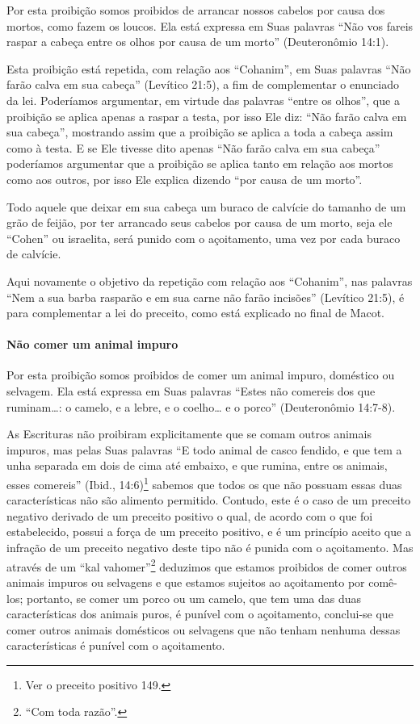 Por esta proibição somos proibidos de arrancar nossos cabelos por causa
dos mortos, como fazem os loucos. Ela está expressa em Suas palavras
``Não vos fareis raspar a cabeça entre os olhos por causa de um morto''
(Deuteronômio 14:1).

Esta proibição está repetida, com relação aos ``Cohanim'', em Suas
palavras ``Não farão calva em sua cabeça'' (Levítico 21:5), a fim de
complementar o enunciado da lei. Poderíamos argumentar, em virtude das
palavras ``entre os olhos'', que a proibição se aplica apenas a raspar a
testa, por isso Ele diz: ``Não farão calva em sua cabeça'', mostrando
assim que a proibição se aplica a toda a cabeça assim como à testa. E se
Ele tivesse dito apenas ``Não farão calva em sua cabeça'' poderíamos
argumentar que a proibição se aplica tanto em relação aos mortos como
aos outros, por isso Ele explica dizendo ``por causa de um morto''.

Todo aquele que deixar em sua cabeça um buraco de calvície do tamanho de
um grão de feijão, por ter arrancado seus cabelos por causa de um morto,
seja ele ``Cohen'' ou israelita, será punido com o açoitamento, uma vez
por cada buraco de calvície.

Aqui novamente o objetivo da repetição com relação aos ``Cohanim'', nas
palavras ``Nem a sua barba rasparão e em sua carne não farão incisões''
(Levítico 21:5), é para complementar a lei do preceito, como está
explicado no final de Macot.

\paragraph{Não comer um animal impuro}

Por esta proibição somos proibidos de comer um animal impuro, doméstico
ou selvagem. Ela está expressa em Suas palavras ``Estes não comereis
dos que ruminam\ldots{}: o camelo, e a lebre, e o coelho\ldots{} e o porco''
(Deuteronômio 14:7-8).

As Escrituras não proibiram explicitamente que se comam outros animais
impuros, mas pelas Suas palavras ``E todo animal de casco fendido, e que
tem a unha separada em dois de cima até embaixo, e que rumina, entre os
animais, esses comereis'' (Ibid., 14:6)\footnote{Ver o preceito positivo 149.} sabemos
que todos os que não possuam essas duas características não são alimento
permitido. Contudo, este é o caso de um preceito negativo derivado de um
preceito positivo o qual, de acordo com o que foi estabelecido, possui a
força de um preceito positivo, e é um princípio aceito que a infração de
um preceito negativo deste tipo não é punida com o açoitamento. Mas
através de um ``kal vahomer''\footnote{``Com toda razão''.} deduzimos que
estamos proibidos de comer outros animais impuros ou selvagens e que
estamos sujeitos ao açoitamento por comê-los; portanto, se comer um
porco ou um camelo, que tem uma das duas características dos animais
puros, é punível com o açoitamento, conclui-se que comer outros animais
domésticos ou selvagens que não tenham nenhuma dessas características é
punível com o açoitamento.

